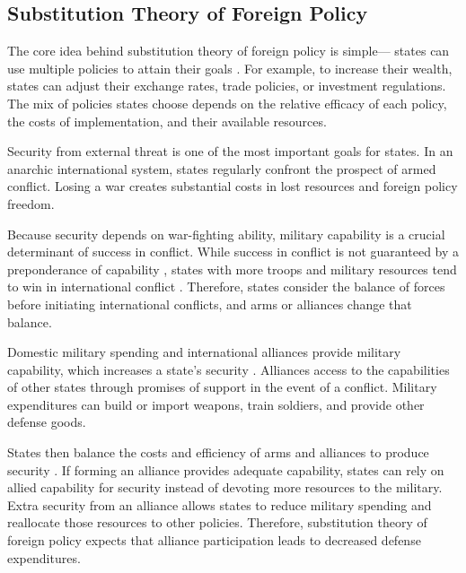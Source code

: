 \documentclass[12pt]{article}
\begin{document}
\subsection{Substitution Theory of Foreign Policy}

The core idea behind substitution theory of foreign policy is simple--- states can use multiple policies to attain their goals \citep{MostStarr1989}. 
For example, to increase their wealth, states can adjust their exchange rates, trade policies, or investment regulations. 
The mix of policies states choose depends on the relative efficacy of each policy, the costs of implementation, and their available resources. 


Security from external threat is one of the most important goals for states. 
In an anarchic international system, states regularly confront the prospect of armed conflict. 
Losing a war creates substantial costs in lost resources and foreign policy freedom.

Because security depends on war-fighting ability, military capability is a crucial determinant of success in conflict. 
While success in conflict is not guaranteed by a preponderance of capability \citep{Arreguin-Toft2005, Sullivan2012}, states with more troops and military resources tend to win in international conflict \citep{Fearon2018}. 
Therefore, states consider the balance of forces before initiating international conflicts, and arms or alliances change that balance. 


Domestic military spending and international alliances provide military capability, which increases a state's security \citep{Morrow1993}. 
Alliances access to the capabilities of other states through promises of support in the event of a conflict. 
Military expenditures can build or import weapons, train soldiers, and provide other defense goods. 


States then balance the costs and efficiency of arms and alliances to produce security \citep{Morrow1993, Conybeare1994}. 
If forming an alliance provides adequate capability, states can rely on allied capability for security instead of devoting more resources to the military. 
Extra security from an alliance allows states to reduce military spending and reallocate those resources to other policies. 
Therefore, substitution theory of foreign policy expects that alliance participation leads to decreased defense expenditures.
\end{document}

